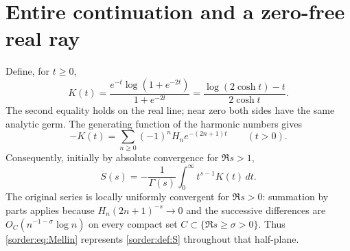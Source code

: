 \documentclass[11pt,a4paper]{article}
\theoremstyle{definition}
\theoremstyle{remark}
\numberwithin{equation}{section}
\begin{document}
\section{Entire continuation and a zero-free real ray}

Define, for $t\ge0$,
\begin{equation}\label{sorder:def:K}
 K(t)=\frac{e^{-t}\log(1+e^{-2t})}{1+e^{-2t}}
     =\frac{\log(2\cosh t)-t}{2\cosh t}.
\end{equation}
The second equality holds on the real line; near zero both sides have
the same analytic germ. The generating function of the harmonic
numbers gives
\[
 -K(t)=\sum_{n\ge0}(-1)^nH_n e^{-(2n+1)t}\qquad(t>0).
\]
Consequently, initially by absolute convergence for $\Re s>1$,
\begin{equation}\label{sorder:eq:Mellin}
 S(s)=-\frac1{\Gamma(s)}\int_0^\infty t^{s-1}K(t)\,dt.
\end{equation}
The original series is locally uniformly convergent for $\Re s>0$:
summation by parts applies because $H_n(2n+1)^{-s}\to0$ and the
successive differences are $O_C(n^{-1-\sigma}\log n)$ on every compact
set $C\subset\{\Re s\ge\sigma>0\}$. Thus \eqref{sorder:eq:Mellin}
represents \eqref{sorder:def:S} throughout that half-plane.
\end{document}
